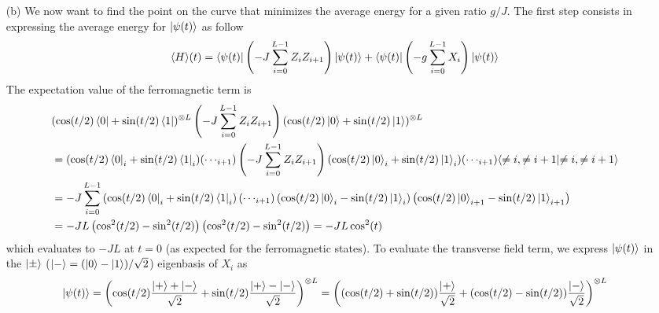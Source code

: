 \documentclass[10pt, a4paper]{article}
\begin{document}
{\begin{enumerate}
  To do a variational analysis of the evolution of the ground state between $g = 0, J \neq 0$ and $g \neq 0, J = 0$, we consider a parametric curve in the Hilbert space of which the endpoints are $\ket{\psi_{PM}}$ and $\ket{\psi_{FM}^0}$. Noticing that the states at the endpoints are product states of identical states, we take the curve to be successive states in a rotation of each individual spin from the $+Z$ to the $+X$ direction. Such an interpolation, can be written as $\ket{\psi(t)} = (\cos(t/2)\ket{0} + \sin(t/2)\ket{1})^{\otimes L}$ where $t=0$ corresponds to $\ket{\psi_{FM}^0}$ and $t = \pi/2$ to $\ket{\psi_{PM}}$. 

  \item[(b)] We now want to find the point on the curve that minimizes the average energy for a given ratio $g/J$. The first step consists in expressing the average energy for $\ket{\psi(t)}$ as follow 
  \begin{align*}
    \langle H \rangle(t) = \bra{\psi(t)} \left(- J \sum_{i=0}^{L-1} Z_i Z_{i+1}\right) \ket{\psi(t)} +\bra{\psi(t)}\left(- g \sum_{i=0}^{L-1} X_i\right) \ket{\psi(t)}
  \end{align*}
  The expectation value of the ferromagnetic term is 
  \begin{align*}
    &(\cos(t/2)\bra{0} + \sin(t/2)\bra{1})^{\otimes L} \left(- J \sum_{i=0}^{L-1} Z_i Z_{i+1}\right) (\cos(t/2)\ket{0} + \sin(t/2)\ket{1})^{\otimes L} \\
    &= (\cos(t/2)\bra{0}_i + \sin(t/2)\bra{1}_i)(\cdots_{i+1}) \left(- J \sum_{i=0}^{L-1} Z_i Z_{i+1}\right) (\cos(t/2)\ket{0}_i + \sin(t/2)\ket{1}_i)(\cdots_{i+1}) \langle{\neq i, \neq i + 1}|{\neq i, \neq i + 1}\rangle\\
    &= -J \sum_{i=0}^{L-1} \left(\cos(t/2)\bra{0}_i + \sin(t/2)\bra{1}_i\right)(\cdots_{i+1})
    \left(\cos(t/2)\ket{0}_i - \sin(t/2)\ket{1}_i\right)\left(\cos(t/2)\ket{0}_{i+1} - \sin(t/2)\ket{1}_{i+1}\right)\\
    &= -J L \left(\cos^2(t/2)- \sin^2(t/2)\right)\left(\cos^2(t/2)- \sin^2(t/2)\right) = -JL \cos^2(t)
  \end{align*}
  which evaluates to $-JL$ at $t = 0$ (as expected for the ferromagnetic states). To evaluate the transverse field term, we express $\ket{\psi(t)}$ in the $\ket{\pm}$ ($\ket{-} = (\ket{0}-\ket{1})/\sqrt{2}$) eigenbasis of $X_i$ as 
  \begin{align*}
  \ket{\psi(t)} = \left(\cos(t/2)\frac{\ket{+}+\ket{-}}{\sqrt{2}}+\sin(t/2)\frac{\ket{+}-\ket{-}}{\sqrt{2}}\right)^{\otimes L} =  \left((\cos(t/2) + \sin(t/2))\frac{\ket{+}}{\sqrt{2}}+(\cos(t/2)-\sin(t/2))\frac{\ket{-}}{\sqrt{2}}\right)^{\otimes L} 

\end{align*}
\end{enumerate}}
\end{document}
